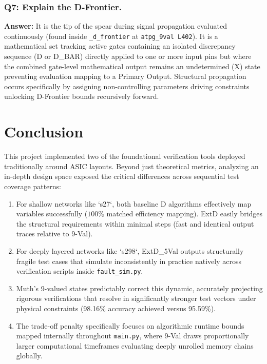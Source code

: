 \documentclass[12pt, a4paper]{article}
\begin{document}
\subsubsection*{Q7: Explain the D-Frontier.}
\textbf{Answer:} It is the tip of the spear during signal propagation evaluated continuously (found inside \texttt{\_d\_frontier} at \texttt{atpg\_9val L402}). It is a mathematical set tracking active gates containing an isolated discrepancy sequence (D or D\_BAR) directly applied to one or more input pins but where the combined gate-level mathematical output remains an undetermined (X) state preventing evaluation mapping to a Primary Output. Structural propagation occurs specifically by assigning non-controlling parameters driving constraints unlocking D-Frontier bounds recursively forward.

\newpage
\section{Conclusion}

This project implemented two of the foundational verification tools deployed traditionally around ASIC layouts. Beyond just theoretical metrics, analyzing an in-depth design space exposed the critical differences across sequential test coverage patterns: 

\begin{enumerate}
    \item For shallow networks like `s27`, both baseline D algorithms effectively map variables successfully ($100\%$ matched efficiency mapping). ExtD easily bridges the structural requirements within minimal steps (fast and identical output traces relative to 9-Val).
    \item For deeply layered networks like `s298`, ExtD\_5Val outputs structurally fragile test cases that simulate inconsistently in practice natively across verification scripts inside \texttt{fault\_sim.py}. 
    \item Muth's 9-valued states predictably correct this dynamic, accurately projecting rigorous verifications that resolve in significantly stronger test vectors under physical constraints (98.16\% accuracy achieved versus 95.59\%). 
    \item The trade-off penalty specifically focuses on algorithmic runtime bounds mapped internally throughout \texttt{main.py}, where 9-Val draws proportionally larger computational timeframes evaluating deeply unrolled memory chains globally.
\end{enumerate}
\end{document}
